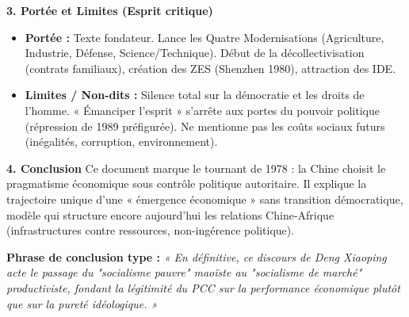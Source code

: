\documentclass[11pt]{article}
\newcommand{\cle}[1]{{\popxbold\color{popdark}#1}}
\begin{document}
\begin{exoresolu}
\textbf{3. Portée et Limites (Esprit critique)}
\begin{itemize}
    \item \textbf{Portée :} Texte fondateur. Lance les \cle{Quatre Modernisations} (Agriculture, Industrie, Défense, Science/Technique). Début de la décollectivisation (contrats familiaux), création des \cle{ZES} (Shenzhen 1980), attraction des IDE.
    \item \textbf{Limites / Non-dits :} Silence total sur la \cle{démocratie} et les droits de l'homme. « Émanciper l'esprit » s'arrête aux portes du pouvoir politique (répression de 1989 préfigurée). Ne mentionne pas les coûts sociaux futurs (inégalités, corruption, environnement).
\end{itemize}

\textbf{4. Conclusion}
Ce document marque le \cle{tournant de 1978} : la Chine choisit le \cle{pragmatisme économique} sous contrôle politique autoritaire. Il explique la trajectoire unique d'une « émergence économique » sans transition démocratique, modèle qui structure encore aujourd'hui les relations Chine-Afrique (infrastructures contre ressources, non-ingérence politique).

\textbf{Phrase de conclusion type :} \emph{« En définitive, ce discours de Deng Xiaoping acte le passage du "socialisme pauvre" maoïste au "socialisme de marché" productiviste, fondant la légitimité du PCC sur la performance économique plutôt que sur la pureté idéologique. »}
\end{exoresolu}
\end{document}
